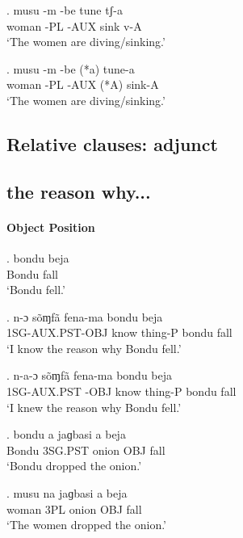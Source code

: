 \documentclass{assets/fieldnotes}
\begin{document}
{

\exg.
musu    -m    -be    tune   tʃ-a  \\
woman   -PL   -AUX   sink   v-A \\%
`The women are diving/sinking.' \label{The women are diving - little v}


\exg.
musu    -m    -be    (*a)   tune-a \\
woman   -PL   -AUX   (*A)   sink-A \\%
`The women are diving/sinking.' \label{The women are diving}

\subsection*{Relative clauses: adjunct} 

\subsection*{the reason why...}

\paragraph*{Object Position}

\exg.
bondu   beja \\
Bondu   fall \\%
`Bondu fell.'


\exg.
n-ɔ      sõɱfã   fena-ma   bondu   beja \\
1SG-AUX.PST-OBJ  know    thing-P   bondu   fall \\%
`I know the reason why Bondu fell.'

\exg.
n-a-ɔ      sõɱfã   fena-ma   bondu   beja \\
1SG-AUX.PST -OBJ   know    thing-P   bondu   fall \\%
`I knew the reason why Bondu fell.'

\exg.
bondu   a     jaɡbasi   a     beja \\
Bondu   3SG.PST   onion     OBJ   fall \\%
`Bondu dropped the onion.'

\exg.
musu    na    jaɡbasi   a     beja \\
woman   3PL   onion     OBJ   fall \\%
`The women dropped the onion.' \label{The women dropped the onion}

}
\end{document}
